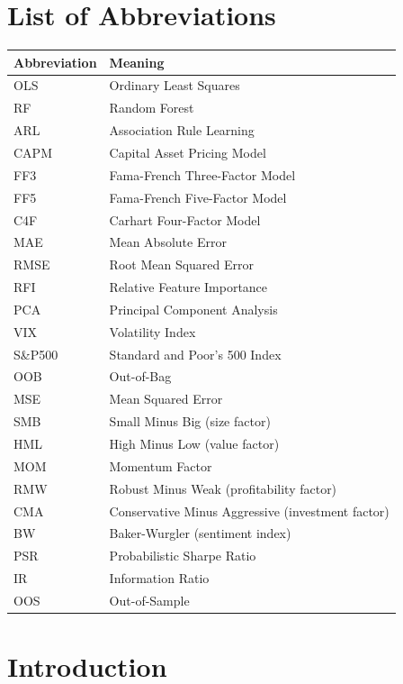 \documentclass[a4paper,11pt]{article}
\begin{document}
\newpage
\section*{List of Abbreviations}
\begin{tabular}{@{}ll}
\textbf{Abbreviation} & \textbf{Meaning} \\
\midrule
OLS & Ordinary Least Squares \\
RF & Random Forest \\
ARL & Association Rule Learning \\
CAPM & Capital Asset Pricing Model \\
FF3 & Fama-French Three-Factor Model \\
FF5 & Fama-French Five-Factor Model \\
C4F & Carhart Four-Factor Model \\
MAE & Mean Absolute Error \\
RMSE & Root Mean Squared Error \\
RFI & Relative Feature Importance \\
PCA & Principal Component Analysis \\
VIX & Volatility Index \\
S\&P500 & Standard and Poor's 500 Index \\
OOB & Out-of-Bag \\
MSE & Mean Squared Error \\
SMB & Small Minus Big (size factor) \\
HML & High Minus Low (value factor) \\
MOM & Momentum Factor \\
RMW & Robust Minus Weak (profitability factor) \\
CMA & Conservative Minus Aggressive (investment factor) \\
BW & Baker-Wurgler (sentiment index) \\
PSR & Probabilistic Sharpe Ratio \\
IR & Information Ratio \\
OOS & Out-of-Sample \\
\end{tabular}

\newpage
\tableofcontents
\newpage

\section{Introduction} \label{sec:introduction}
    
\end{document}
